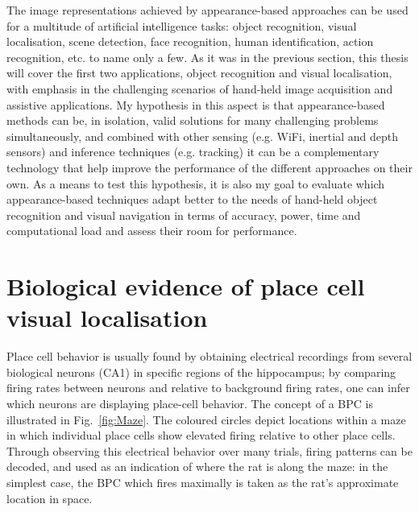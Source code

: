 The image representations achieved by appearance-based approaches can be used for a multitude of artificial intelligence tasks: object recognition, visual localisation, scene detection, face recognition, human identification, action recognition, etc. to name only a few. As it was in the previous section, this thesis will cover the first two applications, object recognition and visual localisation, with emphasis in the challenging scenarios of hand-held image acquisition and assistive applications. My hypothesis in this aspect is that appearance-based methods can be, in isolation, valid solutions for many challenging problems simultaneously, and combined with other sensing (e.g. WiFi, inertial and depth sensors) and inference techniques (e.g. tracking) it can be a complementary technology that help improve the performance of the different approaches on their own. As a means to test this hypothesis, it is also my goal to evaluate which appearance-based techniques adapt better to the needs of hand-held object recognition and visual navigation in terms of accuracy, power, time and computational load and assess their room for performance.

 

\section{Biological evidence of place cell visual localisation} 

Place cell behavior is usually found by obtaining electrical recordings from several biological neurons (CA1) in specific regions of the hippocampus; by comparing firing rates between neurons and relative to background firing rates, one can infer which neurons are displaying place-cell behavior. The concept of a BPC is illustrated in Fig.~\ref{fig:Maze}.  The coloured circles depict locations within a maze in which individual place cells show elevated firing relative to other place cells.  Through observing this electrical behavior over many trials, firing patterns can be decoded, and used as an indication of where the rat is along the maze: in the simplest case, the BPC which fires maximally is taken as the rat's approximate location in space. \\

